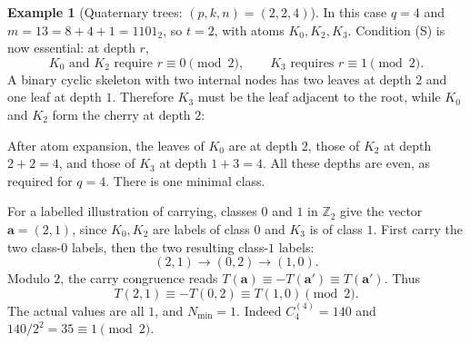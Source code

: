 \documentclass[11pt]{amsart}
\theoremstyle{definition}
\newtheorem{example}[theorem]{Example}
\theoremstyle{remark}
\newcommand{\Z}{\mathbb Z}
\begin{document}
\begin{example}[Quaternary trees: $(p,k,n)=(2,2,4)$]\label{ex:quaternary}
In this case $q=4$ and $m=13=8+4+1=1101_2$, so $t=2$, with atoms $K_0,K_2,K_3$.  Condition (S) is now essential: at depth $r$,
\[
 K_0\text{ and }K_2\text{ require }r\equiv0\pmod2,
 \qquad K_3\text{ requires }r\equiv1\pmod2.
\]
A binary cyclic skeleton with two internal nodes has two leaves at depth $2$ and one leaf at depth $1$.  Therefore $K_3$ must be the leaf adjacent to the root, while $K_0$ and $K_2$ form the cherry at depth $2$:
\begin{center}
\end{center}
After atom expansion, the leaves of $K_0$ are at depth $2$, those of $K_2$ at depth $2+2=4$, and those of $K_3$ at depth $1+3=4$.  All these depths are even, as required for $q=4$.  There is one minimal class.

For a labelled illustration of carrying, classes $0$ and $1$ in $\Z_2$ give the vector $\mathbf a=(2,1)$, since $K_0,K_2$ are labels of class $0$ and $K_3$ is of class $1$.  First carry the two class-$0$ labels, then the two resulting class-$1$ labels:
\[
 (2,1)\longrightarrow(0,2)\longrightarrow(1,0).
\]
Modulo $2$, the carry congruence reads $T(\mathbf a)\equiv-T(\mathbf a')\equiv T(\mathbf a')$.  Thus
\[
 T(2,1)\equiv-T(0,2)\equiv T(1,0)\pmod2.
\]
The actual values are all $1$, and $N_{\min}=1$.  Indeed $C_4^{(4)}=140$ and $140/2^2=35\equiv1\pmod2$.
\end{example}
\end{document}
